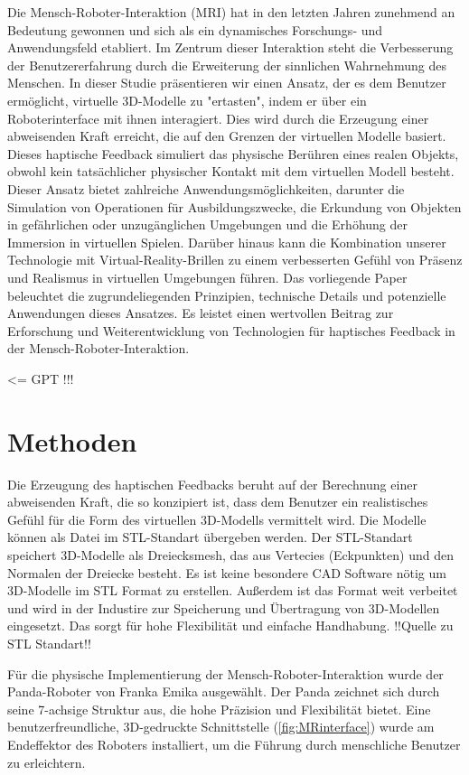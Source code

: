 \documentclass[conference]{IEEEtran}
\begin{document}
Die Mensch-Roboter-Interaktion (MRI) hat in den letzten Jahren zunehmend an 
Bedeutung gewonnen und sich als ein dynamisches Forschungs- und Anwendungsfeld etabliert. 
Im Zentrum dieser Interaktion steht die Verbesserung der Benutzererfahrung durch die Erweiterung 
der sinnlichen Wahrnehmung des Menschen.
In dieser Studie präsentieren wir einen Ansatz, der es dem Benutzer ermöglicht, virtuelle 
3D-Modelle zu "ertasten", indem er über ein Roboterinterface mit ihnen interagiert. 
Dies wird durch die Erzeugung einer abweisenden Kraft erreicht, die auf den Grenzen der 
virtuellen Modelle basiert. Dieses haptische Feedback simuliert das physische Berühren eines 
realen Objekts, obwohl kein tatsächlicher physischer Kontakt mit dem virtuellen Modell besteht. 
Dieser Ansatz bietet zahlreiche Anwendungsmöglichkeiten, darunter die Simulation von Operationen 
für Ausbildungszwecke, die Erkundung von Objekten in gefährlichen oder unzugänglichen Umgebungen 
und die Erhöhung der Immersion in virtuellen Spielen. Darüber hinaus kann die Kombination unserer
 Technologie mit Virtual-Reality-Brillen zu einem verbesserten Gefühl von Präsenz und Realismus 
 in virtuellen Umgebungen führen.
Das vorliegende Paper beleuchtet die zugrundeliegenden Prinzipien, technische Details und 
potenzielle Anwendungen dieses Ansatzes. Es leistet einen wertvollen Beitrag zur Erforschung 
und Weiterentwicklung von Technologien für haptisches Feedback in der Mensch-Roboter-Interaktion.

<= GPT !!!

\section{Methoden}

Die Erzeugung des haptischen Feedbacks beruht auf der Berechnung einer abweisenden Kraft, die so 
konzipiert ist, dass dem Benutzer ein realistisches Gefühl für die Form des virtuellen 
3D-Modells vermittelt wird. Die Modelle können als Datei im STL-Standart übergeben werden.
Der STL-Standart speichert 3D-Modelle als Dreiecksmesh, das aus Vertecies (Eckpunkten) und den 
Normalen der Dreiecke besteht. Es ist keine besondere CAD Software nötig um 3D-Modelle im STL 
Format zu erstellen. Außerdem ist das Format weit verbeitet und wird in der Industire zur
Speicherung und Übertragung von 3D-Modellen eingesetzt. Das sorgt für hohe Flexibilität 
und einfache Handhabung. !!Quelle zu STL Standart!!

Für die physische Implementierung der Mensch-Roboter-Interaktion wurde der Panda-Roboter von 
Franka Emika ausgewählt. Der Panda zeichnet sich durch seine 7-achsige Struktur aus, die hohe 
Präzision und Flexibilität bietet. Eine benutzerfreundliche, 3D-gedruckte Schnittstelle 
(\ref{fig:MRinterface}) wurde am Endeffektor des Roboters installiert, um die Führung durch 
menschliche Benutzer zu erleichtern.  
\end{document}
